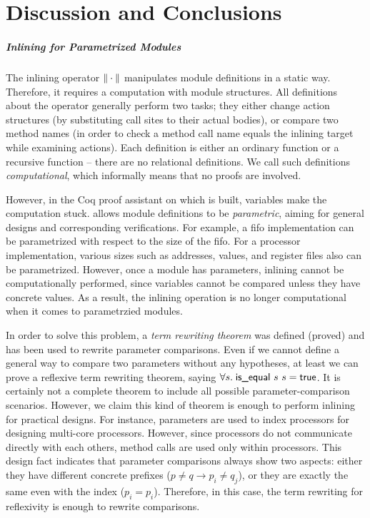 \chapter{Discussion and Conclusions}
\label{chap:conclusions}

\paragraph{Inlining for Parametrized Modules}

The inlining operator $\| \cdot \|$ manipulates module definitions
in a static way. Therefore, it requires a computation with module
structures. All definitions about the operator generally perform two
tasks; they either change action structures (by substituting call
sites to their actual bodies), or compare two method names (in order
to check a method call name equals the inlining target while examining
actions). Each definition is either an ordinary function or a
recursive function -- there are no relational definitions. We call
such definitions \emph{computational}, which informally means that no
proofs are involved.

However, in the Coq proof assistant on which \Kami{} is built,
variables make the computation stuck. \Kami{} allows module
definitions to be \emph{parametric}, aiming for general designs and
corresponding verifications. For example, a fifo implementation can be
parametrized with respect to the size of the fifo. For a processor
implementation, various sizes such as addresses, values, and register
files also can be parametrized.  However, once a module has
parameters, inlining cannot be computationally performed, since
variables cannot be compared unless they have concrete values. As a
result, the inlining operation is no longer computational when it
comes to parametrzied modules.

In order to solve this problem, a \emph{term rewriting theorem} was
defined (proved) and has been used to rewrite parameter
comparisons. Even if we cannot define a general way to compare two
parameters without any hypotheses, at least we can prove a reflexive
term rewriting theorem, saying $\forall s.\; \textsf{is\_equal}\ s\ s
= \textsf{true}$. It is certainly not a complete theorem to include all
possible parameter-comparison scenarios. However, we claim this kind
of theorem is enough to perform inlining for practical designs. For
instance, parameters are used to index processors for designing
multi-core processors. However, since processors do not communicate
directly with each others, method calls are used only within
processors. This design fact indicates that parameter comparisons
always show two aspects: either they have different concrete prefixes
($p \neq q \to p_i \neq q_j$), or they are exactly the same even with
the index ($p_i = p_i$). Therefore, in this case, the term rewriting
for reflexivity is enough to rewrite comparisons.

